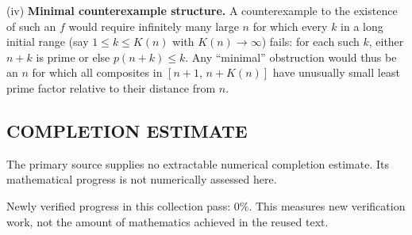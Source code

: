 (iv) \textbf{Minimal counterexample structure.}
A counterexample to the existence of such an $f$ would require infinitely many large $n$ for which every $k$ in a long initial range (say $1\le k\le K(n)$ with $K(n)\to\infty$) fails: for each such $k$, either $n+k$ is prime or else $p(n+k)\le k$. Any ``minimal'' obstruction would thus be an $n$ for which all composites in $[n+1,\,n+K(n)]$ have unusually small least prime factor relative to their distance from $n$.




\subsection*{COMPLETION ESTIMATE}
The primary source supplies no extractable numerical completion estimate. Its mathematical progress is not numerically assessed here.

Newly verified progress in this collection pass: $0\%$. This measures new verification work, not the amount of mathematics achieved in the reused text.
